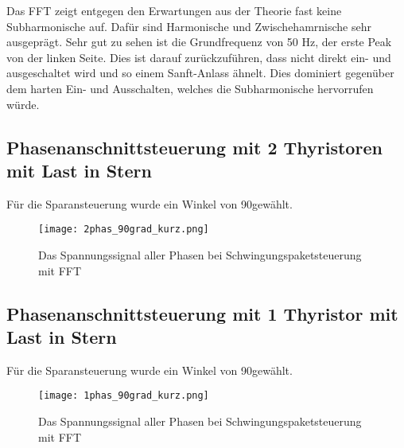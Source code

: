 Das FFT zeigt entgegen den Erwartungen aus der Theorie fast keine Subharmonische auf. Dafür sind Harmonische und Zwischehamrnische sehr ausgeprägt. Sehr gut zu sehen ist die Grundfrequenz von 50 Hz, der erste Peak von der linken Seite. Dies ist darauf zurückzuführen, dass nicht direkt ein- und ausgeschaltet wird und so einem Sanft-Anlass ähnelt. Dies dominiert gegenüber dem harten Ein- und Ausschalten, welches die Subharmonische hervorrufen würde.
\newpage
\subsection{Phasenanschnittsteuerung mit 2 Thyristoren mit Last in Stern}
Für die Sparansteuerung wurde ein Winkel von 90\textdegree gewählt. 

\begin{figure}[ht!]
	\centering
	\texttt{[image: 2phas\_90grad\_kurz.png]}	
	\caption{Das Spannungssignal aller Phasen bei Schwingungspaketsteuerung mit FFT}\label{fig:Mess_2phas_kurz}
\end{figure}


\subsection{Phasenanschnittsteuerung mit 1 Thyristor mit Last in Stern}
Für die Sparansteuerung wurde ein Winkel von 90\textdegree gewählt. 

\begin{figure}[ht!]
	\centering
	\texttt{[image: 1phas\_90grad\_kurz.png]}	
	\caption{Das Spannungssignal aller Phasen bei Schwingungspaketsteuerung mit FFT}\label{fig:Mess_1phas_kurz}
\end{figure}





